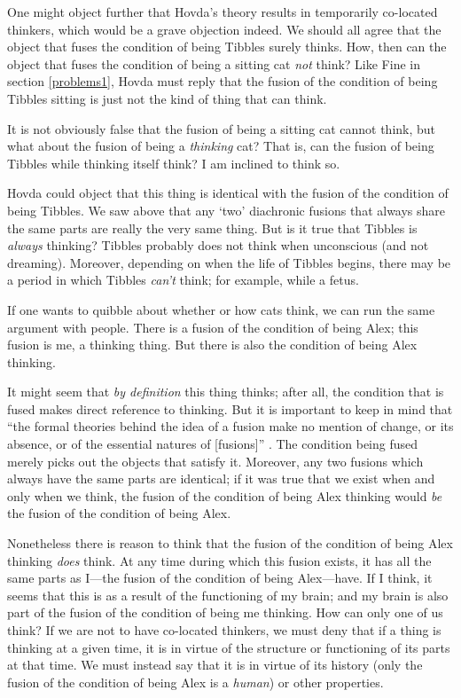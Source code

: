 \documentclass[11pt]{article}
\begin{document}
\begin{spacing}{1.5}
One might object further that Hovda's theory results in temporarily
co-located thinkers, which would be a grave objection indeed.  We
should all agree that the object that fuses the condition of being
Tibbles surely thinks.  How, then can the object that fuses the
condition of being a sitting cat {\em not} think?  Like Fine in
section \ref{problems1}, Hovda must reply that the fusion of the
condition of being Tibbles sitting is just not the kind of thing that
can think.

It is not obviously false that the fusion of being a sitting cat
cannot think, but what about the fusion of being a {\em thinking} cat?
That is, can the fusion of being Tibbles while thinking itself think?
I am inclined to think so.

Hovda could object that this thing is identical with the fusion of the
condition of being Tibbles.  We saw above that any `two' diachronic
fusions that always share the same parts are really the very same
thing.  But is it true that Tibbles is {\em always} thinking?  Tibbles
probably does not think when unconscious (and not dreaming).
Moreover, depending on when the life of Tibbles begins, there may be a
period in which Tibbles {\em can't} think; for example, while a fetus.

If one wants to quibble about whether or how cats think, we can run
the same argument with people.  There is a fusion of the condition of
being Alex; this fusion is me, a thinking thing.  But there is also
the condition of being Alex thinking.

It might seem that {\em by definition} this thing thinks; after all,
the condition that is fused makes direct reference to thinking.  But
it is important to keep in mind that ``the formal theories behind the
idea of a fusion make no mention of change, or its absence, or of the
essential natures of [fusions]'' \citep[sec. 1]{hovda2011}.  The
condition being fused merely picks out the objects that satisfy it.
Moreover, any two fusions which always have the same parts are
identical; if it was true that we exist when and only when we think,
the fusion of the condition of being Alex thinking would {\em be} the
fusion of the condition of being Alex.

Nonetheless there is reason to think that the fusion of the condition
of being Alex thinking {\em does} think.  At any time during which
this fusion exists, it has all the same parts as I---the fusion of the
condition of being Alex---have.  If I think, it seems that this is as
a result of the functioning of my brain; and my brain is also part of
the fusion of the condition of being me thinking.  How can only one of
us think?  If we are not to have co-located thinkers, we must deny
that if a thing is thinking at a given time, it is in virtue of the
structure or functioning of its parts at that time.  We must instead
say that it is in virtue of its history (only the fusion of the
condition of being Alex is a {\em human}) or other properties.


\end{spacing}
\end{document}
